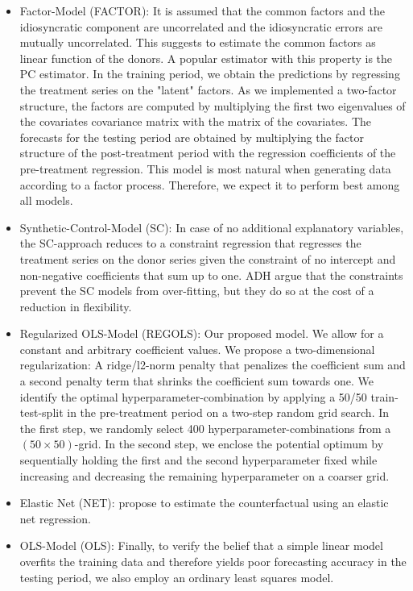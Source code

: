 \begin{itemize}
	\item Factor-Model (FACTOR): It is assumed that the common factors and the idiosyncratic component are uncorrelated and the idiosyncratic errors are mutually uncorrelated. This suggests to estimate the common factors as linear function of the donors. A popular estimator with this property is the \ac{PC} estimator. In the training period, we obtain the predictions by regressing the treatment series on the "latent" factors. As we implemented a two-factor structure, the factors are computed by multiplying the first two eigenvalues of the covariates covariance matrix with the matrix of the covariates. The forecasts for the testing period are obtained by multiplying the factor structure of the post-treatment period with the regression coefficients of the pre-treatment regression. This model is most natural when generating data according to a factor process. Therefore, we expect it to perform best among all models.
	\item Synthetic-Control-Model (SC): In case of no additional explanatory variables, the \ac{SC}-approach reduces to a constraint regression that regresses the treatment series on the donor series given the constraint of no intercept and non-negative coefficients that sum up to one. \ac{ADH} argue that the constraints prevent the SC models from over-fitting, but they do so at the cost of a reduction in flexibility.
	\item Regularized OLS-Model (REGOLS): Our proposed model. We allow for a constant and arbitrary coefficient values. We propose a two-dimensional regularization: A ridge/l2-norm penalty that penalizes the coefficient sum and a second penalty term that shrinks the coefficient sum towards one. We identify the optimal hyperparameter-combination by applying a 50/50 train-test-split in the pre-treatment period on a two-step random grid search. In the first step, we randomly select 400 hyperparameter-combinations from a $(50 \times 50)$-grid. In the second step, we enclose the potential optimum by sequentially holding the first and the second hyperparameter fixed while increasing and decreasing the remaining hyperparameter on a coarser grid. 
	\item Elastic Net (NET): \cite{doudchenko:2016} propose to estimate the counterfactual using an elastic net regression. 
	\item OLS-Model (OLS): Finally, to verify the belief that a simple linear model overfits the training data and therefore yields poor forecasting accuracy in the testing period, we also employ an ordinary least squares model.

\end{itemize}
